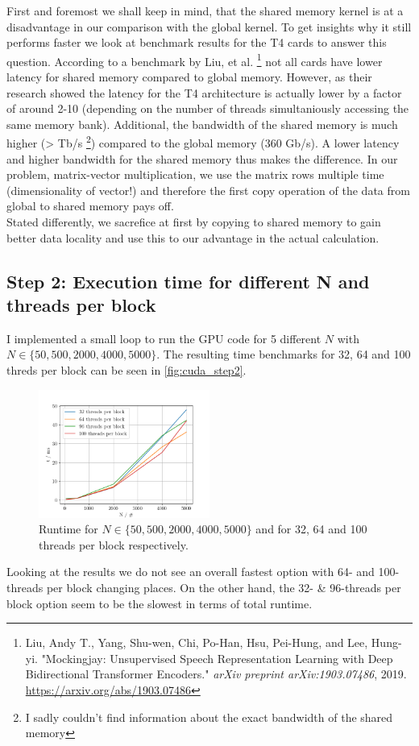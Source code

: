 First and foremost we shall keep in mind, that the shared memory kernel is at a disadvantage in our comparison with the global kernel. To get insights why it still performs faster we look at benchmark results for the T4 cards to answer this question. According to a benchmark by Liu, et al. \footnote{Liu, Andy T., Yang, Shu-wen, Chi, Po-Han, Hsu, Pei-Hung, and Lee, Hung-yi. "Mockingjay: Unsupervised Speech Representation Learning with Deep Bidirectional Transformer Encoders." \textit{arXiv preprint arXiv:1903.07486}, 2019. \url{https://arxiv.org/abs/1903.07486}} not all cards have lower latency for shared memory compared to global memory. However, as their research showed the latency for the T4 architecture is actually lower by a factor of around 2-10 (depending on the number of threads simultaniously accessing the same memory bank). Additional, the bandwidth of the shared memory is much higher (> Tb/s \footnote{I sadly couldn't find information about the exact bandwidth of the shared memory}) compared to the global memory (360 Gb/s). A lower latency and higher bandwidth for the shared memory thus makes the difference. In our problem, matrix-vector multiplication, we use the matrix rows multiple time (dimensionality of vector!) and therefore the first copy operation of the data from global to shared memory pays off. \\
Stated differently, we sacrefice at first by copying to shared memory to gain better data locality and use this to our advantage in the actual calculation. 

\subsection{Step 2: Execution time for different N and threads per block}
I implemented a small loop to run the GPU code for 5 different $N$ with $N \in \{50, 500, 2000, 4000, 5000\}$. The resulting time benchmarks for 32, 64 and 100 threds per block can be seen in \autoref{fig:cuda_step2}. 
\begin{figure}[H]
    \centering
    \includegraphics[width=0.5\textwidth]{../fig/lab3/step2.png}
    \caption{Runtime for $N \in \{50, 500, 2000, 4000, 5000\}$ and for 32, 64 and 100 threads per block respectively.}
    \label{fig:cuda_step2}
\end{figure}
Looking at the results we do not see an overall fastest option with 64- and 100-threads per block changing places. On the other hand, the 32- \& 96-threads per block option seem to be the slowest in terms of total runtime. \\

